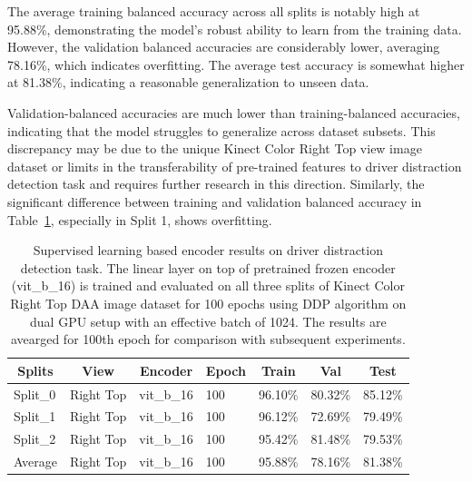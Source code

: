The average training balanced accuracy across all splits is notably high at 95.88\%, demonstrating the model's robust ability to learn from the training data. However, the validation balanced accuracies are considerably lower, averaging 78.16\%, which indicates overfitting. The average test accuracy is somewhat higher at 81.38\%, indicating a reasonable generalization to unseen data.

Validation-balanced accuracies are much lower than training-balanced accuracies, indicating that the model struggles to generalize across dataset subsets. This discrepancy may be due to the unique Kinect Color Right Top view image dataset or limits in the transferability of pre-trained features to driver distraction detection task and requires further research in this direction. Similarly, the significant difference between training and validation balanced accuracy in Table~\ref{table:experiment 1 results}, especially in Split 1, shows overfitting. 
\begin{table}[htbp]
\caption[Results of experiment 1: supervised learning based encoder]{Supervised learning based encoder results on driver distraction detection task. The linear layer on top of pretrained frozen encoder (vit\_b\_16) is trained and evaluated on all three splits of Kinect Color Right Top DAA image dataset for 100 epochs using DDP algorithm on dual GPU setup with an effective batch of 1024. The results are avearged for 100th epoch for comparison with subsequent experiments.}
\label{table:experiment 1 results}
\centering
\begin{tabular}{lllllll}
\multicolumn{1}{c}{\textbf{Splits}} & \multicolumn{1}{c}{\textbf{View}} & \multicolumn{1}{c}{\textbf{Encoder}} & \multicolumn{1}{c}{\textbf{Epoch}} & \multicolumn{1}{c}{\textbf{Train}} & \multicolumn{1}{c}{\textbf{Val}} & \multicolumn{1}{c}{\textbf{Test}}\\
\hline
Split\_0 & Right Top & vit\_b\_16 & 100 & 96.10\% & 80.32\% & 85.12\% \\
Split\_1 & Right Top & vit\_b\_16 & 100 & 96.12\% & 72.69\% & 79.49\% \\
Split\_2 & Right Top & vit\_b\_16 & 100 & 95.42\% & 81.48\% & 79.53\% \\
\hline
Average & Right Top & vit\_b\_16 & 100 & 95.88\% & 78.16\% & 81.38\% \\
\hline
\end{tabular}
\end{table}


